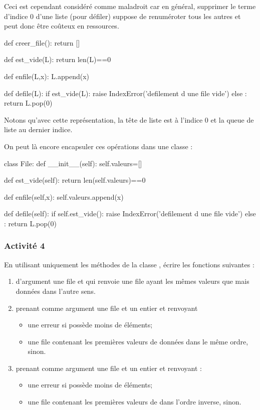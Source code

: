 \documentclass[11pt,a4paper,french,twoside]{PMCours}
\begin{document}
Ceci est cependant considéré comme maladroit car en général, supprimer le terme 
d'indice 0 d'une liste (pour défiler) suppose de renuméroter tous les autres et 
peut donc être coûteux en ressources.

\begin{Python}
def creer_file():
    return []
    
def est_vide(L):
    return len(L)==0

def enfile(L,x):
    L.append(x)

def defile(L):
    if est_vide(L):
        raise IndexError('defilement d une file vide')
    else :
        return L.pop(0)
\end{Python}%

Notons qu'avec cette représentation, la tête de liste est à l'indice 0 et la queue 
de liste au dernier indice.

On peut là encore encapsuler ces opérations dans une classe  :

\begin{Python}
class File:
    def __init__(self):
        self.valeurs=[]
    
    def est_vide(self):
        return len(self.valeurs)==0
    
    def enfile(self,x):
        self.valeurs.append(x)
    
    def defile(self):
        if self.est_vide():
            raise IndexError('defilement d une file vide')
        else :
            return L.pop(0)
\end{Python}%

\subsubsection*{Activité 4}
En utilisant uniquement les méthodes de la classe , écrire les fonctions 
suivantes : 
\begin{enumerate}
\item {} d'argument une file  et qui renvoie une file 
ayant les mêmes valeurs que  mais données dans l'autre sens.
\item {} prenant comme argument une file  et 
un entier  et renvoyant 
\begin{itemize}
\item une erreur si  possède moins de  éléments;
\item une file contenant les  premières valeurs de  
données dans le même ordre, sinon.
\end{itemize}
\item {} prenant comme argument une file  et un entier 
 et renvoyant :
\begin{itemize}
    \item une erreur si  possède moins de  éléments;
    \item une file contenant les  premières valeurs de  
    dans l'ordre inverse, sinon.
\end{itemize}
\end{enumerate}
\end{document}

